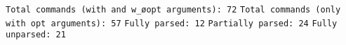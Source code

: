 \texttt{Total commands (with and w_\o opt arguments): 72}\newline
\texttt{Total commands (only with opt arguments): 57}\newline
\texttt{Fully parsed: 12}\newline
\texttt{Partially parsed: 24}\newline
\texttt{Fully unparsed: 21}\newline

